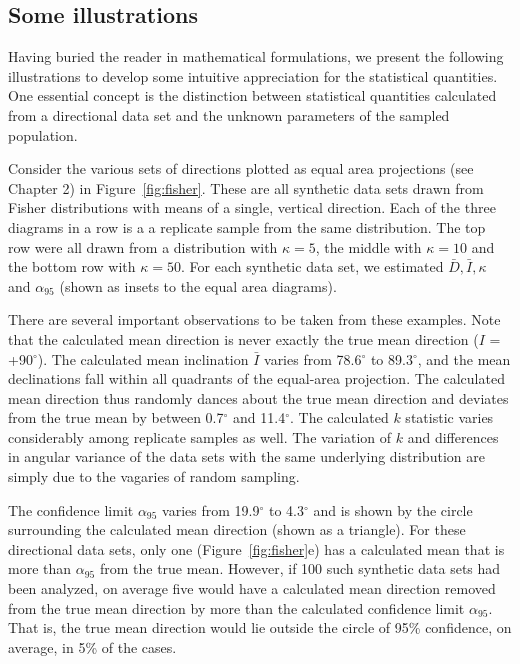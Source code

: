 \subsection{Some illustrations}

Having buried the reader in mathematical formulations, we present the following illustrations to develop some
intuitive appreciation for the statistical quantities. One essential concept is the distinction between statistical
quantities calculated from a directional data set and the unknown parameters of the sampled population.


Consider the various sets of directions plotted as equal area projections (see Chapter  2) in
Figure~\ref{fig:fisher}.  These are all synthetic data sets drawn from 
Fisher distributions  with means of a single, vertical direction.     Each  of the three diagrams in a row is a a  replicate sample from the same distribution. The top row were all drawn from a distribution with $\kappa= 5$, the middle with $\kappa=10$ and the bottom row with $\kappa=50$.     For each synthetic data set, we estimated $\bar D, \bar I, \kappa$ and $\alpha_{95}$ (shown as insets to the equal area diagrams).  

There are several important observations to be taken from these  examples. Note that the calculated mean
direction is never exactly the true mean direction ($I $ = +90$^{\circ}$). The calculated mean inclination $\bar I$ varies from
78.6$^{\circ}$  to 89.3$^{\circ}$, and the  mean declinations fall  within all quadrants of the equal-area projection.   The calculated mean direction thus randomly dances about the true mean direction
and deviates from the true mean by between 0.7$^{\circ}$ and 11.4$^{\circ}$.
The calculated $k$  statistic varies considerably among replicate samples as well.   The variation of $k$ and differences in angular
variance of the data sets with the same underlying distribution are simply due to the vagaries of random sampling. 

The confidence limit $\alpha_{95}$  varies from 19.9$^{\circ}$ to 4.3$^{\circ}$ and is shown by the circle surrounding the
calculated mean direction (shown as a triangle). For these directional data sets, only one (Figure~\ref{fig:fisher}e)  has a calculated mean that is more than
$\alpha_{95}$ from the true mean. However, if 100 such synthetic data sets had been analyzed, on average five  would have a calculated mean direction removed from the true mean direction by more than the calculated
confidence limit $\alpha_{95}$. That is, the true mean direction would lie outside the circle of 95\% confidence, on
average, in 5\% of the cases.

